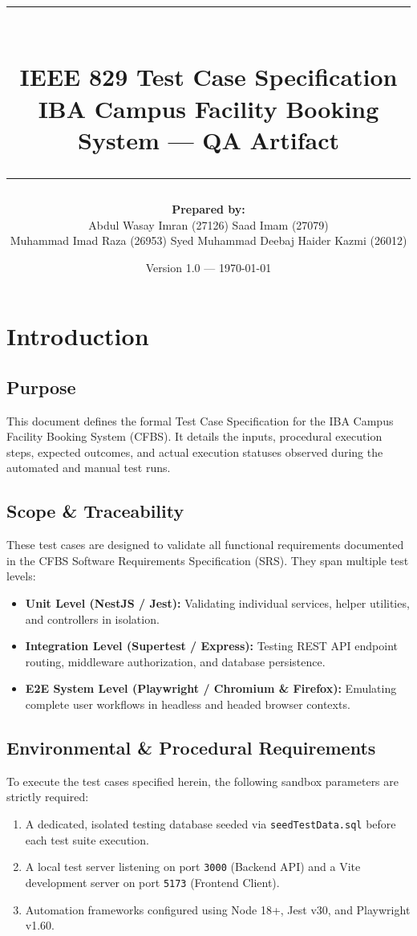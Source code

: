 \documentclass[11pt,a4paper]{article}
\title{
    \rule{\textwidth}{1.5pt} \\
    \textbf{\Large IEEE 829 Test Case Specification} \\
    \large IBA Campus Facility Booking System --- QA Artifact \\
    \rule{\textwidth}{1.5pt}
}
\author{
    \textbf{Prepared by:} \\
    Abdul Wasay Imran (27126) \quad Saad Imam (27079) \\
    Muhammad Imad Raza (26953) \quad Syed Muhammad Deebaj Haider Kazmi (26012)
}
\date{Version 1.0 --- \today}
\begin{document}
\maketitle
\newpage
\tableofcontents
\newpage

\section{Introduction}

\subsection{Purpose}
This document defines the formal Test Case Specification for the IBA Campus Facility Booking System (CFBS). It details the inputs, procedural execution steps, expected outcomes, and actual execution statuses observed during the automated and manual test runs.

\subsection{Scope & Traceability}
These test cases are designed to validate all functional requirements documented in the CFBS Software Requirements Specification (SRS). They span multiple test levels:
\begin{itemize}[noitemsep]
    \item \textbf{Unit Level (NestJS / Jest):} Validating individual services, helper utilities, and controllers in isolation.
    \item \textbf{Integration Level (Supertest / Express):} Testing REST API endpoint routing, middleware authorization, and database persistence.
    \item \textbf{E2E System Level (Playwright / Chromium \& Firefox):} Emulating complete user workflows in headless and headed browser contexts.
\end{itemize}

\subsection{Environmental & Procedural Requirements}
To execute the test cases specified herein, the following sandbox parameters are strictly required:
\begin{enumerate}[noitemsep]
    \item A dedicated, isolated testing database seeded via \texttt{seedTestData.sql} before each test suite execution.
    \item A local test server listening on port \texttt{3000} (Backend API) and a Vite development server on port \texttt{5173} (Frontend Client).
    \item Automation frameworks configured using Node 18+, Jest v30, and Playwright v1.60.
\end{enumerate}
\end{document}
